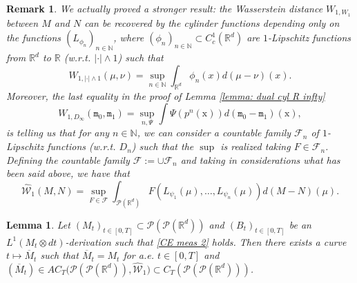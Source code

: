 \documentclass[10pt,leqno]{amsart}
\numberwithin{equation}{section}
\newtheorem{lemma}[teorema]{Lemma}
\newtheorem{oss}[teorema]{Remark}
\newcommand{\R}{\mathbb{R}}
\newcommand{\N}{\mathbb{N}}
\newcommand{\PP}{\mathcal{P}}
\begin{document}
\begin{oss}\label{countable duality wass on wass}
    We actually proved a stronger result: the Wasserstein distance $W_{1,W_1}$ between $M$ and $N$ can be recovered by the cylinder functions depending only on the functions $(L_{\phi_n})_{n\in \N}$, where $(\phi_n)_{n\in \N}\subset C_c^1(\R^d)$ are $1$-Lipschitz functions from $\R^d$ to $\R$ (w.r.t. $|\cdot|\wedge 1$) such that 
    \[W_{1,|\cdot|\wedge 1}(\mu,\nu) = \sup_{n\in \N} \int_{\R^d} \phi_n(x) d(\mu-\nu)(x).\]
    Moreover, the last equality in the proof of Lemma \ref{lemma: dual cyl R infty}
    \[W_{1,D_{\infty}}(\mathtt{m}_0,\mathtt{m}_1) = \sup_{n, \Psi} \int \Psi(p^n(\mathrm{x})) d(\mathtt{m}_0 - \mathtt{m}_1)(\mathrm{x}),\]
    is telling us that for any $n\in \N$, we can consider a countable family $\mathcal{F}_n$ of $1$-Lipschitz functions (w.r.t. $D_n$) such that the $\sup$ is realized taking $F\in \mathcal{F}_n$. Defining the countable family $\mathcal{F}:= \cup \mathcal{F}_n$ and taking in considerations what has been said above, we have that 
    \begin{equation}\label{equation countable duality}
        \hat{\mathcal{W}}_1(M,N) = \sup_{F\in \mathcal{F}} \int_{\PP(\R^d)} F(L_{\psi_1}(\mu),\dots,L_{\psi_n}(\mu)) d(M-N)(\mu).
    \end{equation}
\end{oss}



\begin{lemma}\label{abs cont sol of CE}
    Let $(M_t)_{t\in[0,T]}\subset\PP(\PP(\R^d)) $ and $(B_t)_{t\in [0,T]}$ be an $L^1(M_t \otimes dt)$-derivation such that \eqref{CE meas 2} holds. Then there exists a curve $t\mapsto \overline{M}_t$ such that $\overline{M}_t = M_t$ for a.e. $t\in [0,T]$ and $(\overline{M}_t)\in AC_T\big(\PP(\PP(\R^d)),\hat{\mathcal{W}}_1\big) \subset C_T(\PP(\PP(\R^d)))$. 
\end{lemma}
\end{document}
